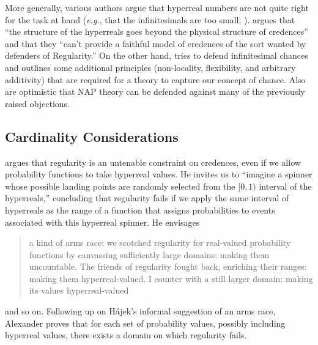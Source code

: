 More generally, various authors argue that hyperreal numbers are not quite right for the task at hand (\textit{e.g.}, that the infinitesimals are too small; \citealp{Easwaran:2014,Pruss:2014}). \citet[pp.~34--35]{Easwaran:2014} argues that ``the structure of the hyperreals goes beyond the physical structure of credences'' and that they ``can't provide a faithful model of credences of the sort wanted by defenders of Regularity.''
On the other hand, \citet{Hofweber:2014} tries to defend infinitesimal chances and outlines some additional principles (non-locality, flexibility, and arbitrary additivity) that are required for a theory to capture our concept of chance. Also \citet{Benci_etal:2018} are optimistic that NAP theory can be defended against many of the previously raised objections.

\subsection{Cardinality Considerations}
\citet{Hajek:2012b} argues that regularity is an untenable constraint on credences, even if we allow probability functions to take hyperreal values. He invites us to ``imagine a spinner whose possible landing points are randomly selected from the $[0, 1)$ interval of the hyperreals,'' concluding that regularity fails if we apply the same interval of hyperreals as the range of a function that assigns probabilities to events associated with this hyperreal spinner.
He envisages
\begin{quote}
a kind of arms race: we scotched regularity for real-valued probability functions by canvassing sufficiently large domains: making them uncountable. The friends of regularity fought back, enriching their ranges: making them hyperreal-valued. I counter with a still larger domain: making its values hyperreal-valued
\end{quote}
and so on. Following up on H\'{a}jek's informal suggestion of an arms race, Alexander \citet{Pruss:2013} proves that for each set of probability values, possibly including hyperreal values, there exists a domain on which regularity fails.

